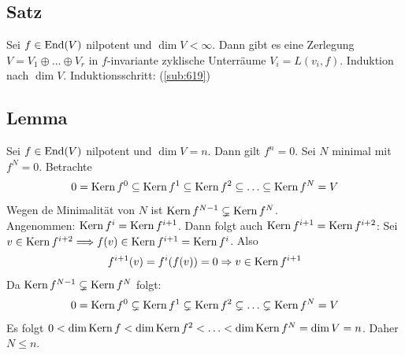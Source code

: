 \subsection[Zerlegung eines Vektorraums in $f$-invariante zyklische Unterräume]{Satz} %
\label{sub:620}
Sei $f \in \operatorname{End}(V)$ nilpotent und $\dim V < \infty$. Dann gibt es eine Zerlegung $V=V_1 \oplus  \ldots \oplus V_r$ in $f$-invariante zyklische Unterräume
$V_i = L(v_i,f)$.
Induktion nach $\dim V$. Induktionsschritt: (\ref{sub:619}) \bewende

\subsection[Lemma über einen nilpotenten Endomorphismus]{Lemma} %
\label{sub:621}
Sei $f \in \operatorname{End}(V)$ nilpotent und $\dim V = n$. Dann gilt $f^n=0$.
Sei $N$ minimal mit $f^N=0$. Betrachte 
\[
	0= \operatorname{Kern} f^0 \subseteq \operatorname{Kern} f^1 \subseteq \operatorname{Kern} f^2 \subseteq \ldots  \subseteq \operatorname{Kern} f^N = V
\]
Wegen de Minimalität von $N$ ist $\operatorname{Kern} f^{N-1} \subsetneq \operatorname{Kern} f^N $. \\
Angenommen: $\operatorname{Kern} f^i =\operatorname{Kern} f^{i+1}$. Dann folgt auch $\operatorname{Kern} f^{i+1}= \operatorname{Kern} f^{i+2}$: Sei $v \in \operatorname{Kern} f^{i+2} \Longrightarrow f(v) \in \operatorname{Kern} f^{i+1}= \operatorname{Kern} f^i$.
Also
\begin{gather*}
	f^{i+1}(v)= f^i (f(v))= 0 \Rightarrow v \in \operatorname{Kern} f^{i+1} 
\end{gather*}
Da $\operatorname{Kern} f^{N-1} \subsetneq \operatorname{Kern} f^N $ folgt:
\begin{gather*}
	0 = \operatorname{Kern} f^0 \subsetneq \operatorname{Kern} f^1 \subsetneq \operatorname{Kern} f^2 \subsetneq \ldots \subsetneq \operatorname{Kern}   f^N = V
\end{gather*}
Es folgt $0 < \dim \operatorname{Kern} f < \dim \operatorname{Kern} f^2 < \ldots < \dim \operatorname{Kern} f^N= \dim V= n$. Daher $N \le n$. \bewende

